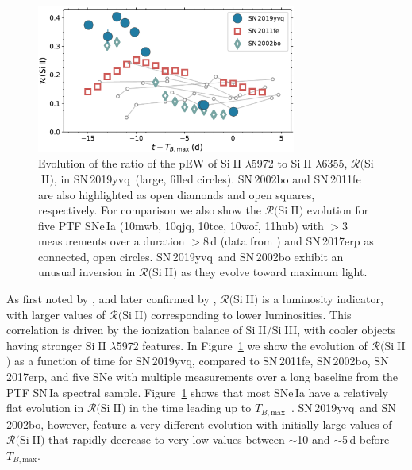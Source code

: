 \documentclass[twocolumn]{aastex63}
\def\ion#1#2{#1$\;${\footnotesize\rm{#2}}\relax}
\newcommand{\tbmax}{$T_{B,\mathrm{max}}$}
\newcommand{\sn}{SN\,2019yvq}
\begin{document}
\begin{figure}
    \centering
    \includegraphics[width=3.35in]{./figures/R_evolution.pdf}
    \caption{Evolution of the ratio of the pEW of \ion{Si}{II} $\lambda$5972
    to \ion{Si}{II} $\lambda$6355, $\mathcal{R}($\ion{Si}{II}$)$, in \sn\
    (large, filled circles). SN\,2002bo \citep[data from][]{Benetti04} and
    SN\,2011fe \citep[data from][]{Pereira13} are also highlighted as open
    diamonds and open squares, respectively. For comparison we also show the
    $\mathcal{R}($\ion{Si}{II}$)$ evolution for five PTF SNe\,Ia (10mwb, 10qjq,
    10tce, 10wof, 11hub) with $> 3$ measurements over a duration $> 8$\,d
    (data from \citealt{Maguire14}) and SN\,2017erp \citep[data
    from][]{Brown19} as connected, open circles. \sn\ and SN\,2002bo exhibit
    an unusual inversion in $\mathcal{R}($\ion{Si}{II}$)$ as they evolve
    toward maximum light.}
    \label{fig:r_evo}
\end{figure}

As first noted by \citet{Nugent95}, and later confirmed by
\citet{Hachinger08}, $\mathcal{R}($\ion{Si}{II}$)$ is a luminosity indicator,
with larger values of $\mathcal{R}($\ion{Si}{II}$)$ corresponding to lower
luminosities. This correlation is driven by the ionization balance of
\ion{Si}{II}/\ion{Si}{III}, with cooler objects having stronger \ion{Si}{II}
$\lambda$5972 features. In Figure~\ref{fig:r_evo} we show the evolution of
$\mathcal{R}($\ion{Si}{II}$)$ as a function of time for \sn, compared to
SN\,2011fe, SN\,2002bo, SN\,2017erp, and five SNe with multiple measurements
over a long baseline from the PTF SN\,Ia spectral sample.
Figure~\ref{fig:r_evo} shows that most SNe\,Ia have a relatively flat
evolution in $\mathcal{R}($\ion{Si}{II}$)$ in the time leading up to \tbmax\
\citep[see also][]{Riess98a}. \sn\ and SN\,2002bo, however, feature a very
different evolution with initially large values of
$\mathcal{R}($\ion{Si}{II}$)$ that rapidly decrease to very low values between
$\sim$10 and $\sim$5\,d before \tbmax.
\end{document}
